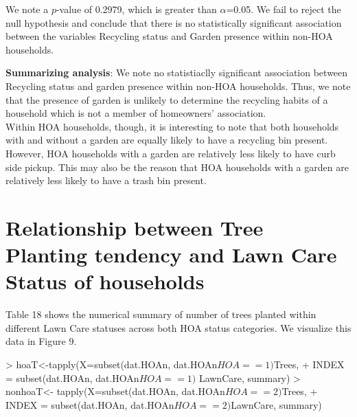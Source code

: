 \documentclass{article}
\begin{document}
We note a $p$-value of 0.2979, which is greater than $\alpha$=0.05. We fail to reject the null hypothesis and conclude that there is no statistically significant association between the variables Recycling status and Garden presence within non-HOA households.

\textbf{Summarizing analysis}: We note no statistiaclly significant association between Recycling status and garden presence within non-HOA households. Thus, we note that the presence of garden is unlikely to determine the recycling habits of a household which is not a member of homeowners' association.\\

Within HOA households, though, it is interesting to note that both households with and without a garden are equally likely to have a recycling bin present. However, HOA households with a garden are relatively less likely to have curb side pickup. This may also be the reason that HOA households with a garden are relatively less likely to have a trash bin present.\\

\section*{Relationship between Tree Planting tendency and Lawn Care Status of households}

Table 18 shows the numerical summary of number of trees planted within different Lawn Care statuses across both HOA status categories. We visualize this data in Figure 9.

\begin{Schunk}
\begin{Sinput}
> hoaT<-tapply(X=subset(dat.HOAn, dat.HOAn$HOA==1)$Trees,
+     INDEX = subset(dat.HOAn, dat.HOAn$HOA==1)$ LawnCare, summary)
> nonhoaT<- tapply(X=subset(dat.HOAn, dat.HOAn$HOA==2)$Trees,
+     INDEX = subset(dat.HOAn, dat.HOAn$HOA==2)$LawnCare, summary)
\end{Sinput}
\end{Schunk}
\end{document}
